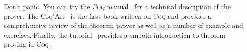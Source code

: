 \documentclass[a4paper]{faq}
\def\Coq{\textsc{Coq }}
\begin{document}
\label{lastquestion}

Don't panic. You can try the \Coq manual~\cite{Coq:e} for a technical
description of the prover. The Coq'Art~\cite{Coq:coqart} is the first
book written on \Coq and provides a comprehensive review of the
theorem prover as well as a number of example and exercises. Finally,
the tutorial~\cite{Coq:Tutorial} provides a smooth introduction to
theorem proving in \Coq.

\newpage
\nocite{LaTeX:intro}
\nocite{LaTeX:symb}



\end{document}

